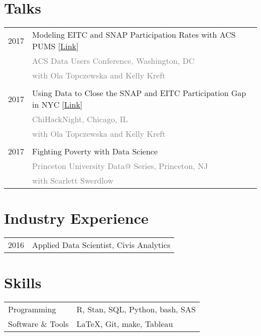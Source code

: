 \documentclass[12pt]{article}
\begin{document}
\section*{Talks}
\label{sec:talks}
\begin{tabular}{p{\datecolumn} l}
2017 & Modeling EITC and SNAP Participation Rates with ACS PUMS
[\href{http://www.ebmcdn.net/prb/iframe-video-viewer.php?viewnode=acs-may17/acs-051117-south-6}{Link}] \\
& \textcolor{gray}{ACS Data Users Conference, Washington, DC} \\
& \textcolor{gray}{with Ola Topczewska and Kelly Kreft} \\
& \\[-1.5ex]
2017 & Using Data to Close the SNAP and EITC Participation Gap in NYC
[\href{https://www.youtube.com/watch?v=XSQOCXwNqUA6}{Link}] \\
& \textcolor{gray}{ChiHackNight, Chicago, IL} \\
& \textcolor{gray}{with Ola Topczewska and Kelly Kreft} \\
& \\[-1.5ex]
2017 & Fighting Poverty with Data Science \\
& \textcolor{gray}{Princeton University Data@ Series, Princeton, NJ} \\
& \textcolor{gray}{with Scarlett Swerdlow} \\
\end{tabular}

\section*{Industry Experience}
\label{sec:industry_experience}
\begin{tabular}{p{\spancolumn} l}
2016\textendash18 & Applied Data Scientist, Civis Analytics
\end{tabular}

\section*{Skills}
\label{sec:skills}
\begin{tabular}{l l}
Programming & R, Stan, SQL, Python, bash, SAS \\
Software \& Tools & \LaTeX, Git, make, Tableau
\end{tabular}
\end{document}
